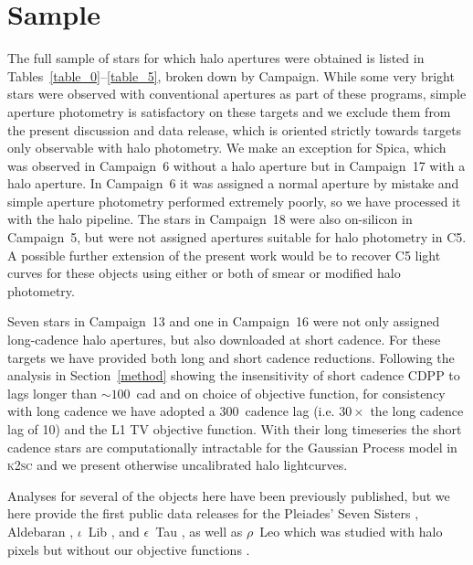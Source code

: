 \documentclass[modern]{aastex62}
\begin{document}
\section{Sample}
\label{sec:sample}


The full sample of stars for which halo apertures were obtained is listed in Tables~\ref{table_0}--\ref{table_5}, broken down by Campaign. While some very bright stars were observed with conventional apertures as part of these programs, simple aperture photometry is satisfactory on these targets and we exclude them from the present discussion and data release, which is oriented strictly towards targets only observable with halo photometry. 
We make an exception for Spica, which was observed in Campaign~6 without a halo aperture but in Campaign~17 with a halo aperture. In Campaign~6 it was assigned a normal aperture by mistake and simple aperture photometry performed extremely poorly, so we have processed it with the halo pipeline. The stars in Campaign~18 were also on-silicon in Campaign~5, but were not assigned apertures suitable for halo photometry in C5. A possible further extension of the present work would be to recover C5 light curves for these objects using either or both of smear or modified halo photometry.

Seven stars in Campaign~13 and one in Campaign~16 were not only assigned long-cadence halo apertures, but also downloaded at short cadence. For these targets we have provided both long and short cadence reductions. Following the analysis in Section~\ref{method} showing the insensitivity of short cadence CDPP to lags longer than $\sim 100$~cad and on choice of objective function, for consistency with long cadence we have adopted a 300~cadence lag (i.e. $30 \times$ the long cadence lag of 10) and the L1 TV objective function. With their long timeseries the short cadence stars are computationally intractable for the Gaussian Process model in \textsc{k2sc} and we present otherwise uncalibrated halo lightcurves.



Analyses for several of the objects here have been previously published, but we here provide the first public data releases for the Pleiades' Seven Sisters \citep{White2017}, Aldebaran \citep{Farr2018}, $\iota$~Lib \citep{Buysschaert2018}, and $\epsilon$~Tau \citep{Arentoft2019}, as well as $\rho$~Leo which was studied with halo pixels but without our objective functions \citep{Aerts2018}.
\end{document}
